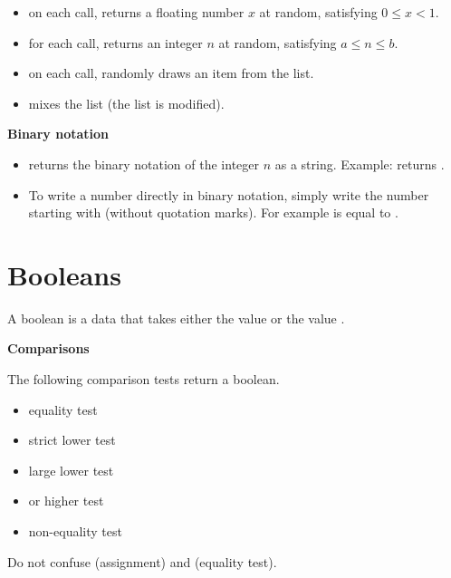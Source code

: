 \documentclass[11pt,class=report,crop=false]{standalone}
\begin{document}
\begin{itemize}
  \item {}\quad on each call, returns a floating number $x$ at random, satisfying $0 \le x < 1$.
  \item {} \quad for each call, returns an integer $n$ at random, satisfying $a \le n \le b$.
  \item {} \quad on each call, randomly draws an item from the list.
  \item {} \quad mixes the list (the list is modified).
 \end{itemize}

\bigskip

\textbf{Binary notation}

\begin{itemize}
  \item {}\quad returns the binary notation of the integer $n$ as a string. 
  Example:  returns .
  
  \item To write a number directly in binary notation, simply write the number starting with  (without quotation marks). For example  is equal to .
 \end{itemize}




\section{Booleans}

A boolean is a data that takes either the value  or the value .

  
\bigskip

\textbf{Comparisons}
 
The following comparison tests return a boolean.
  \begin{itemize}
    \item {} \quad equality test
    	\item {} \quad strict lower test
    	\item {} \quad large lower test
    	\item {} \quad or \quad {}\quad higher test
    	\item {} \quad non-equality test
  \end{itemize}
  
 Do not confuse \og{}\fg{} (assignment) and \og{}\fg{} (equality test).
  
\end{document}
